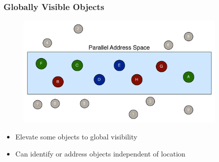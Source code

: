 \begin{frame}
  \frametitle{Globally Visible Objects}
  \begin{figure}\includegraphics[width=0.9\textwidth]{../figures/objectGlobalAddress.pdf}\end{figure}
  \begin{block}{}
    \begin{itemize}
        \item Elevate some objects to global visibility
        \pause
        \item Can identify or address objects independent of location
    \end{itemize}
  \end{block}
\end{frame}


